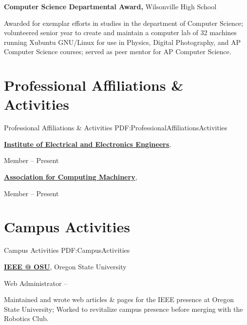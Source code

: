 \documentclass[letterpaper,MMMyyyy,nonstop]{simpleresumecv}
\begin{document}
\begin{body}
\Gap
\textbf{Computer Science Departmental Award,}
Wilsonville High School
\hfill
{}
\GapNoBreak
\begin{detail}
\BulletItem
Awarded for exemplar efforts in studies in the department of Computer Science; volunteered senior year to create and maintain a computer lab of 32 machines running Xubuntu GNU/Linux for use in Physics, Digital Photography, and AP Computer Science courses; served as peer mentor for AP Computer Science.
\end{detail}


\section
{Professional Affiliations\newline
\& Activities}
{Professional Affiliations \& Activities}
{PDF:ProfessionalAffiliationsActivities}

\href{http://www.ieee.org}
{\textbf{Institute of Electrical and Electronics Engineers}},

\GapNoBreak
\BulletItem
Member
\hfill
{} --
Present

\href{http://www.acm.org}
{\textbf{Association for Computing Machinery}},

\GapNoBreak
\BulletItem
Member
\hfill
{} --
Present


\section
{Campus Activities}
{Campus Activities}
{PDF:CampusActivities}

\href{http://groups.engr.oregonstate.edu/ieee-new}
{\textbf{IEEE @ OSU}},
Oregon State University

\GapNoBreak
\BulletItem
Web Administrator
\hfill
{} --
\begin{detail}
\SubBulletItem
Maintained and wrote web articles \& pages for the IEEE presence at Oregon State University; Worked to revitalize campus presence before merging with the Robotics Club.
\end{detail}

\iffalse


\end{body}
\end{document}

